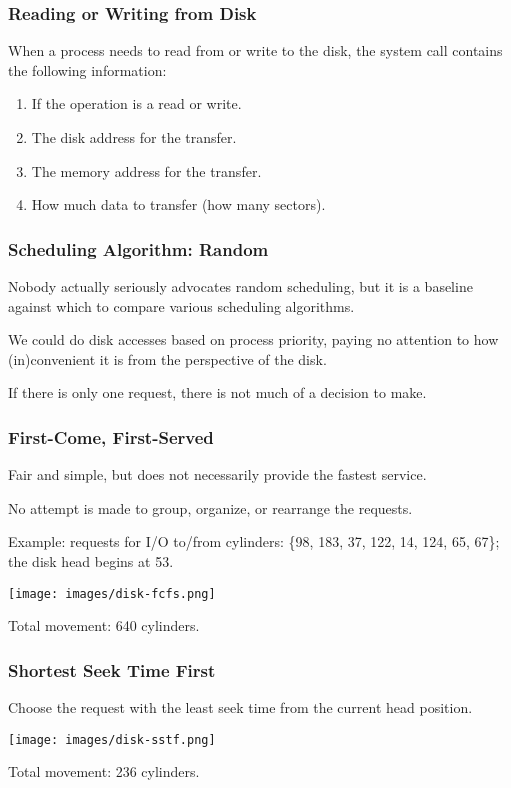 \begin{frame}
\frametitle{Reading or Writing from Disk}

When a process needs to read from or write to the disk, the system call contains the following information:

\begin{enumerate}
	\item If the operation is a read or write.
	\item The disk address for the transfer.
	\item The memory address for the transfer.
	\item How much data to transfer (how many sectors).
\end{enumerate}

\end{frame}

\begin{frame}
\frametitle{Scheduling Algorithm: Random}

Nobody actually seriously advocates random scheduling, but it is a baseline against which to compare various scheduling algorithms. 

We could do disk accesses based on process priority, paying no attention to how (in)convenient it is from the perspective of the disk.

If there is only one request, there is not much of a decision to make.

\end{frame}

\begin{frame}
\frametitle{First-Come, First-Served}

Fair and simple, but does not necessarily provide the fastest service.

No attempt is made to group, organize, or rearrange the requests.

Example: requests for I/O to/from cylinders: \{98, 183, 37, 122, 14, 124, 65, 67\}; the disk head begins at 53.

\begin{center}
	\texttt{[image: images/disk-fcfs.png]}
\end{center}

Total movement: 640 cylinders.

\end{frame}

\begin{frame}
\frametitle{Shortest Seek Time First}

Choose the request with the least seek time from the current head position.

\begin{center}
	\texttt{[image: images/disk-sstf.png]}
\end{center}

Total movement: 236 cylinders.

\end{frame}

